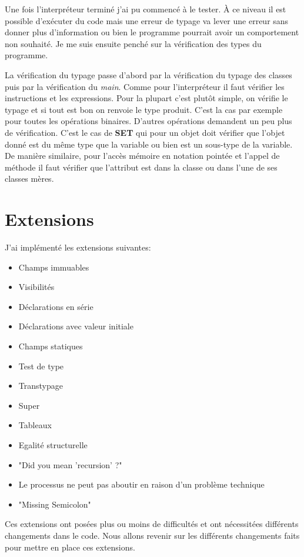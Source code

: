 \documentclass{article}
\begin{document}
Une fois l'interpréteur terminé j'ai pu commencé à le tester. À ce niveau il est possible d'exécuter du code mais une erreur de 
typage va lever une erreur sans donner plus d'information ou bien le programme pourrait avoir un comportement non 
souhaité. Je me suis ensuite penché sur la vérification des types du programme. 

La vérification du typage passe d'abord par la vérification du typage des classes puis par la vérification du 
\textit{main}. Comme pour l'interpréteur il faut vérifier les instructions et les expressions. Pour la plupart 
c'est plutôt simple, on vérifie le typage et si tout est bon on renvoie le type produit. C'est la cas par exemple 
pour toutes les opérations binaires. D'autres opérations demandent un peu plus de vérification. C'est le cas de 
\textbf{SET} qui pour un objet doit vérifier que l'objet donné est du même type que la variable ou bien est un 
sous-type de la variable. De manière similaire, pour l'accès mémoire en notation pointée et l'appel de méthode il
 faut vérifier que l'attribut est dans la classe ou dans l'une de ses classes mères.

\section{Extensions}
J'ai implémenté les extensions suivantes:
\begin{itemize}
    \item Champs immuables
    \item Visibilités
    \item Déclarations en série
    \item Déclarations avec valeur initiale
    \item Champs statiques
    \item Test de type
    \item Transtypage
    \item Super
    \item Tableaux
    \item Egalité structurelle
    \item "Did you mean 'recursion' ?"
    \item Le processus ne peut pas aboutir en raison d'un problème technique
    \item "Missing Semicolon"
\end{itemize}

Ces extensions ont posées plus ou moins de difficultés et ont nécessitées différents changements dans le code.
Nous allons revenir sur les différents changements faits pour mettre en place ces extensions.
\end{document}

